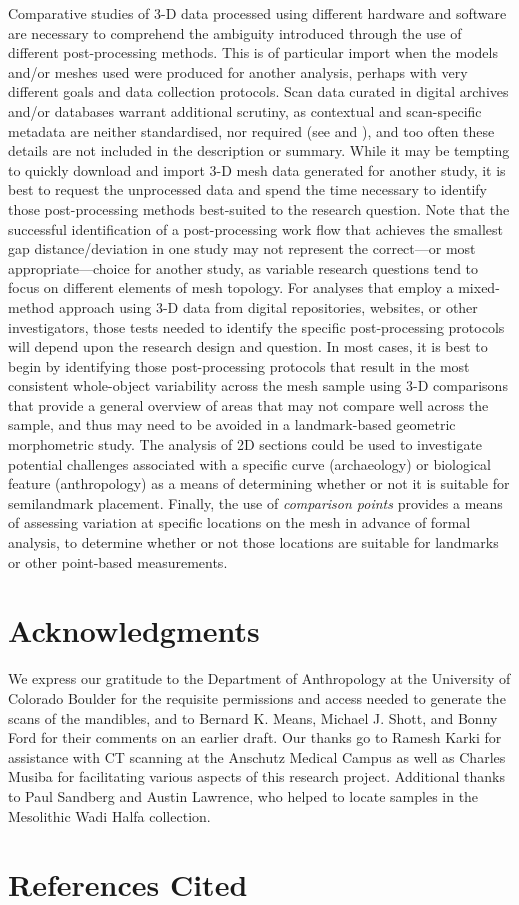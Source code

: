 \documentclass[review]{elsarticle}
\begin{document}
Comparative studies of 3-D data processed using different hardware and software are necessary to comprehend the ambiguity introduced through the use of different post-processing methods. This is of particular import when the models and/or meshes used were produced for another analysis, perhaps with very different goals and data collection protocols. Scan data curated in digital archives and/or databases warrant additional scrutiny, as contextual and scan-specific metadata are neither standardised, nor required (see \citealt{RN5932} and \citealt{RN11507}), and too often these details are not included in the description or summary. While it may be tempting to quickly download and import 3-D mesh data generated for another study, it is best to request the unprocessed data and spend the time necessary to identify those post-processing methods best-suited to the research question. Note that the successful identification of a post-processing work flow that achieves the smallest gap distance/deviation in one study may not represent the correct---or most appropriate---choice for another study, as variable research questions tend to focus on different elements of mesh topology. For analyses that employ a mixed-method approach using 3-D data from digital repositories, websites, or other investigators, those tests needed to identify the specific post-processing protocols will depend upon the research design and question. In most cases, it is best to begin by identifying those post-processing protocols that result in the most consistent whole-object variability across the mesh sample using 3-D comparisons that provide a general overview of areas that may not compare well across the sample, and thus may need to be avoided in a landmark-based geometric morphometric study. The analysis of 2D sections could be used to investigate potential challenges associated with a specific curve (archaeology) or biological feature (anthropology) as a means of determining whether or not it is suitable for semilandmark placement. Finally, the use of \textit{comparison points} provides a means of assessing variation at specific locations on the mesh in advance of formal analysis, to determine whether or not those locations are suitable for landmarks or other point-based measurements.

\section*{Acknowledgments}

We express our gratitude to the Department of Anthropology at the University of Colorado Boulder for the requisite permissions and access needed to generate the scans of the mandibles, and to Bernard K. Means, Michael J. Shott, and Bonny Ford for their comments on an earlier draft. Our thanks go to Ramesh Karki for assistance with CT scanning at the Anschutz Medical Campus as well as Charles Musiba for facilitating various aspects of this research project. Additional thanks to Paul Sandberg and Austin Lawrence, who helped to locate samples in the Mesolithic Wadi Halfa collection.

\section*{References Cited}


\end{document}
